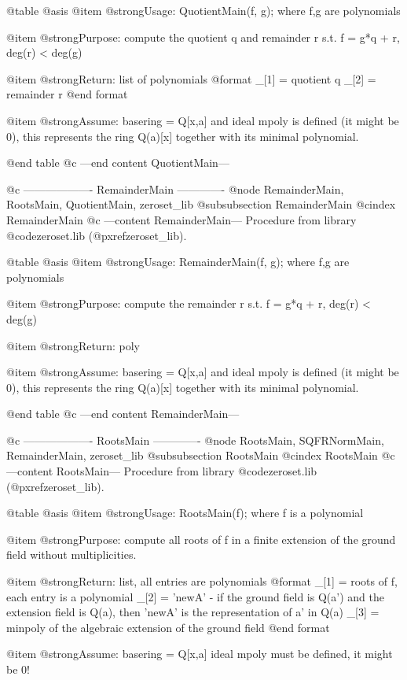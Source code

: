 @table @asis
@item @strong{Usage:}
QuotientMain(f, g); where f,g are polynomials

@item @strong{Purpose:}
compute the quotient q and remainder r s.t. f = g*q + r, deg(r) < deg(g)

@item @strong{Return:}
list of polynomials
  @format
  _[1] = quotient  q
  _[2] = remainder r
  @end format

@item @strong{Assume:}
basering = Q[x,a] and ideal mpoly is defined (it might be 0),
this represents the ring Q(a)[x] together with its minimal polynomial.

@end table
@c ---end content QuotientMain---

@c ------------------- RemainderMain -------------
@node RemainderMain, RootsMain, QuotientMain, zeroset_lib
@subsubsection RemainderMain
@cindex RemainderMain
@c ---content RemainderMain---
Procedure from library @code{zeroset.lib} (@pxref{zeroset_lib}).

@table @asis
@item @strong{Usage:}
RemainderMain(f, g); where f,g are polynomials

@item @strong{Purpose:}
compute the remainder r s.t. f = g*q + r, deg(r) < deg(g)

@item @strong{Return:}
poly

@item @strong{Assume:}
basering = Q[x,a] and ideal mpoly is defined (it might be 0),
this represents the ring Q(a)[x] together with its minimal polynomial.

@end table
@c ---end content RemainderMain---

@c ------------------- RootsMain -------------
@node RootsMain, SQFRNormMain, RemainderMain, zeroset_lib
@subsubsection RootsMain
@cindex RootsMain
@c ---content RootsMain---
Procedure from library @code{zeroset.lib} (@pxref{zeroset_lib}).

@table @asis
@item @strong{Usage:}
RootsMain(f); where f is a polynomial

@item @strong{Purpose:}
compute all roots of f in a finite extension of the ground field
without multiplicities.

@item @strong{Return:}
list, all entries are polynomials
  @format
  _[1] = roots of f, each entry is a polynomial
  _[2] = 'newA' - if the ground field is Q(a') and the extension field
         is Q(a), then 'newA' is the representation of a' in Q(a)
  _[3] = minpoly of the algebraic extension of the ground field
  @end format

@item @strong{Assume:}
basering = Q[x,a] ideal mpoly must be defined, it might be 0!

